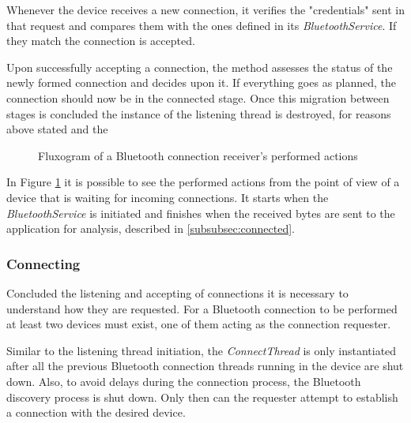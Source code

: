 Whenever the device receives a new connection, it verifies the "credentials" sent in that request and compares them with the ones defined in its \textit{BluetoothService}. If they match the connection is accepted.

Upon successfully accepting a connection, the method assesses the status of the newly formed connection and decides upon it. If everything goes as planned, the connection should now be in the connected stage. Once this migration between stages is concluded the instance of the listening thread is destroyed, for reasons above stated and the 

\begin{figure}[ht]
	\noindent{}
	\caption{\label{fig:btreceiver} Fluxogram of a Bluetooth connection receiver's performed actions}
\end{figure}

In Figure \ref{fig:btreceiver} it is possible to see the performed actions from the point of view of a device that is waiting for incoming connections. It starts when the \textit{BluetoothService} is initiated and finishes when the received bytes are sent to the application for analysis, described in \ref{subsubsec:connected}.

\subsubsection{Connecting}
\label{subsubsec:connecting}

Concluded the listening and accepting of connections it is necessary to understand how they are requested. For a Bluetooth connection to be performed at least two devices must exist, one of them acting as the connection requester.

Similar to the listening thread initiation, the \textit{ConnectThread} is only instantiated after all the previous Bluetooth connection threads running in the device are shut down. Also, to avoid delays during the connection process, the Bluetooth discovery process is shut down. Only then can the requester attempt to establish a connection with the desired device.

